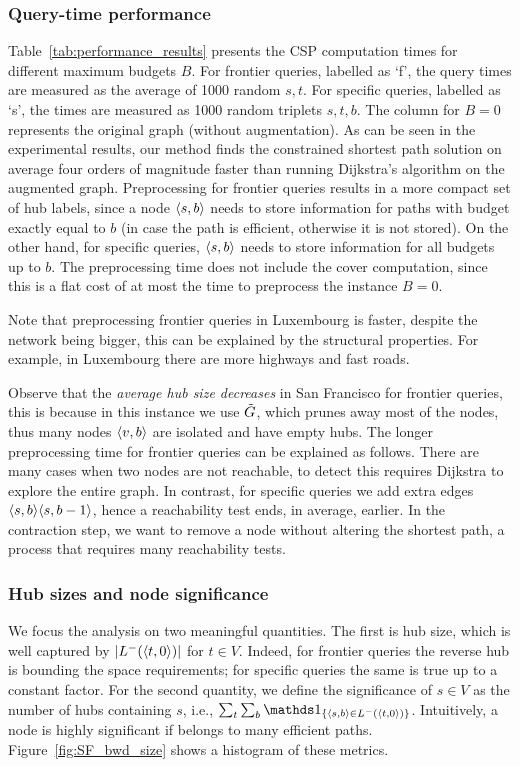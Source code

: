 \subsubsection{Query-time performance}


Table~\ref{tab:performance_results} presents the CSP computation times for different maximum budgets $B$. 
For frontier queries, labelled as `f', the query times are measured as the average of 1000 random $s,t$.
For specific queries, labelled as `s', the times are measured as 1000 random triplets $s,t,b$.
The column for $B=0$ represents the original graph (without augmentation). 
As can be seen in the experimental results, our method finds the constrained shortest path solution on average four orders of magnitude faster than running Dijkstra's algorithm on the augmented graph. 
Preprocessing for frontier queries results in a more compact set of hub labels, since a node $\langle s,b\rangle$ needs to store information for paths with budget exactly equal to $b$ (in case the path is efficient, otherwise it is not stored).
On the other hand, for specific queries, $\langle s,b\rangle$ needs to store information for all budgets up to $b$.
The preprocessing time does not include the cover computation, since this is a flat cost of at most the time to preprocess the instance $B=0$.

Note that preprocessing frontier queries in Luxembourg is faster, despite the network being bigger, this can be explained by the structural properties.
For example, in Luxembourg there are more highways and fast roads.

Observe that the \emph{average hub size decreases} in San Francisco for frontier queries, this is because in this instance we use $\tilde G$, which prunes away most of the nodes, thus many nodes $\langle v,b\rangle$ are isolated and have empty hubs.
The longer preprocessing time for frontier queries can be explained as follows.
There are many cases when two nodes are not reachable, to detect this requires Dijkstra to explore the entire graph.
In contrast, for specific queries we add extra edges $\langle s,b\rangle\langle s,b-1\rangle$, hence a reachability test ends, in average, earlier.
In the contraction step, we want to remove a node without altering the shortest path, a process that requires many reachability tests.


\subsubsection{Hub sizes and node significance}

We focus the analysis on two meaningful quantities.
The first is hub size, which is well captured by  $\lvert L^-(\langle t,0\rangle)\rvert$ for $t\in V$.
Indeed, for frontier queries the reverse hub is bounding the space requirements; for specific queries the same is true up to a constant factor.
For the second quantity, we define the significance of $s\in V$ as the number of hubs containing $s$, i.e., $\sum_t\sum_b\In{\pp{s,b}\in \Lb(\pp{t,0})}$.
Intuitively, a node is highly significant if belongs to many efficient paths.
Figure~\ref{fig:SF_bwd_size} shows a histogram of these metrics. 


